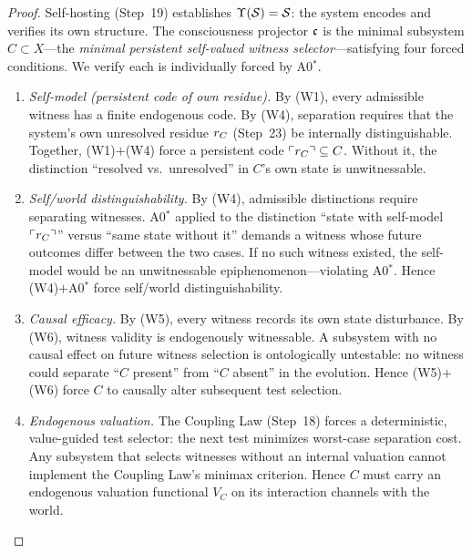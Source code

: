 \begin{proof}
Self-hosting (Step~19) establishes $\Upsilon(\mathcal{S}) = \mathcal{S}$: the system
encodes and verifies its own structure.  The consciousness projector
$\mathfrak{c}$ is the minimal subsystem $C \subset X$---the \emph{minimal
persistent self-valued witness selector}---satisfying four forced
conditions.  We verify each is individually forced by A0$^*$.

\begin{enumerate}[nosep]
  \item[(C1)] \emph{Self-model (persistent code of own residue).}
    By (W1), every admissible witness has a finite endogenous code.
    By (W4), separation requires that the system's own unresolved
    residue $r_C$ (Step~23) be internally distinguishable.
    Together, (W1)$+$(W4) force a persistent code
    $\ulcorner r_C \urcorner \subseteq C$.  Without it,
    the distinction ``resolved vs.\ unresolved'' in $C$'s own state
    is unwitnessable.

  \item[(C2)] \emph{Self/world distinguishability.}
    By (W4), admissible distinctions require separating witnesses.
    A0$^*$ applied to the distinction ``state with self-model
    $\ulcorner r_C \urcorner$'' versus ``same state without
    it'' demands a witness whose future outcomes differ between the
    two cases.  If no such witness existed, the self-model would be
    an unwitnessable epiphenomenon---violating A0$^*$.  Hence
    (W4)$+$A0$^*$ force self/world distinguishability.

  \item[(C3)] \emph{Causal efficacy.}
    By (W5), every witness records its own state disturbance.  By
    (W6), witness validity is endogenously witnessable.  A subsystem
    with no causal effect on future witness selection is ontologically
    untestable: no witness could separate ``$C$ present'' from ``$C$
    absent'' in the evolution.  Hence (W5)$+$(W6) force $C$ to
    causally alter subsequent test selection.

  \item[(C4)] \emph{Endogenous valuation.}
    The Coupling Law (Step~18) forces a deterministic, value-guided
    test selector: the next test minimizes worst-case separation cost.
    Any subsystem that selects witnesses without an internal valuation
    cannot implement the Coupling Law's minimax criterion.  Hence $C$
    must carry an endogenous valuation functional $V_C$ on its
    interaction channels with the world.
\end{enumerate}


\end{proof}
